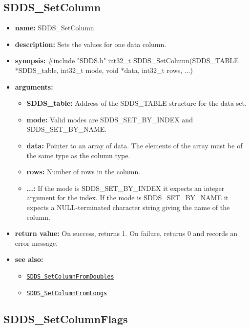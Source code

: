 \documentclass[11pt]{article}
\newcommand{\progref}[1]{\hyperref[SDDS_#1]{\tt SDDS\_#1}}
\begin{document}
\subsection{SDDS\_SetColumn}
\label{SDDS_SetColumn}

\begin{itemize}
\item {\bf name:}\newline
SDDS\_SetColumn
\item {\bf description:}\newline
Sets the values for one data column.
\item {\bf synopsis:} \#include "SDDS.h"\newline
int32\_t SDDS\_SetColumn(SDDS\_TABLE *SDDS\_table, int32\_t mode, void *data, int32\_t rows, ...)
\item {\bf arguments:}
\begin{itemize}
\item {\bf SDDS\_table:} Address of the SDDS\_TABLE structure for the data set.
\item {\bf mode:} Valid modes are SDDS\_SET\_BY\_INDEX and SDDS\_SET\_BY\_NAME.
\item {\bf data:} Pointer to an array of data. The elements of the array must be of the same type as the column type.
\item {\bf rows:} Number of rows in the column.
\item {\bf ...:} If the mode is SDDS\_SET\_BY\_INDEX it expects an integer argument for the index. If the mode is SDDS\_SET\_BY\_NAME it expects a NULL-terminated character string giving the name of the column.
\end{itemize}
\item {\bf return value:}\newline
On success, returns 1. On failure, returns 0 and records an error message.
\item {\bf see also:}
\begin{itemize}
\item \progref{SetColumnFromDoubles}
\item \progref{SetColumnFromLongs}
\end{itemize}
\end{itemize}

\subsection{SDDS\_SetColumnFlags}
\label{SDDS_SetColumnFlags}
\end{document}
